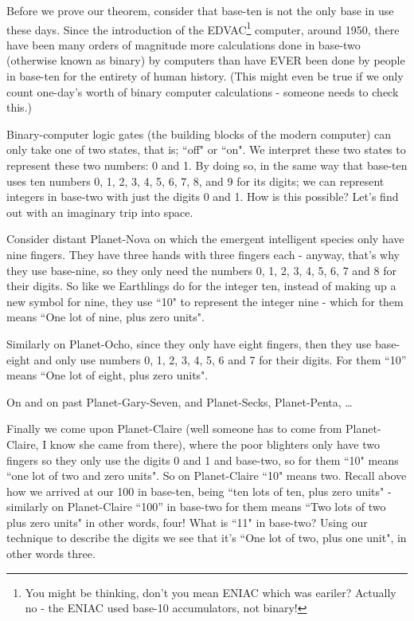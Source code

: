 \documentclass{article}
\begin{document}
Before we prove our theorem,
consider that base-ten is not the only base in use these days.
Since the introduction of the EDVAC\footnote{You might be thinking, don't you
mean ENIAC which was eariler? Actually no - the ENIAC
used base-10 accumulators, not binary!} computer, around 1950,
there have been many orders of magnitude more calculations done
in base-two (otherwise known as binary) by computers than have EVER
been done by people in base-ten for the entirety of human history.
(This might even be true if we only count one-day's worth of
binary computer calculations - someone needs to check this.)

Binary-computer logic gates (the building blocks of the modern computer)
can only take one of two states, that is; ``off" or ``on".
We interpret these two states to represent these two numbers: 0 and 1.
By doing so, in the same way that base-ten uses ten numbers 0,
1, 2, 3, 4, 5, 6, 7, 8, and 9 for its digits; we can represent integers
in base-two with just the digits 0 and 1.  How is this possible?
Let's find out with an imaginary trip into space.

Consider distant Planet-Nova on which the emergent
intelligent species only have nine fingers.
They have three hands with three fingers each - anyway,
that's why they use base-nine, so they only need the numbers 0,
1, 2, 3, 4, 5, 6, 7 and 8 for their digits.
So like we Earthlings do for the integer ten,
instead of making up a new symbol for nine,
they use ``10" to represent the integer nine - which
for them means ``One lot of nine, plus zero units".

Similarly on Planet-Ocho, since they only have eight fingers,
then they use base-eight and only use numbers 0, 1,
2, 3, 4, 5, 6 and 7 for their digits.  For them ``10''
means ``One lot of eight, plus zero units".

On and on past Planet-Gary-Seven, and Planet-Secks, Planet-Penta, \dots{}

Finally we come upon Planet-Claire (well someone
has to come from Planet-Claire,
I know she came from there),
where the poor blighters only have two fingers
so they only use the digits 0 and 1 and base-two,
so for them ``10" means ``one lot of two and zero units".
So on Planet-Claire ``10" means two.
Recall above how we arrived at our 100 in base-ten,
being ``ten lots of ten,
plus zero units" - similarly on Planet-Claire ``100''
in base-two for them means ``Two lots of two plus zero units" in other words,
four! What is ``11" in base-two? Using our technique to
describe the digits we see that it's ``One lot of two, plus one unit",
in other words three.
\end{document}
